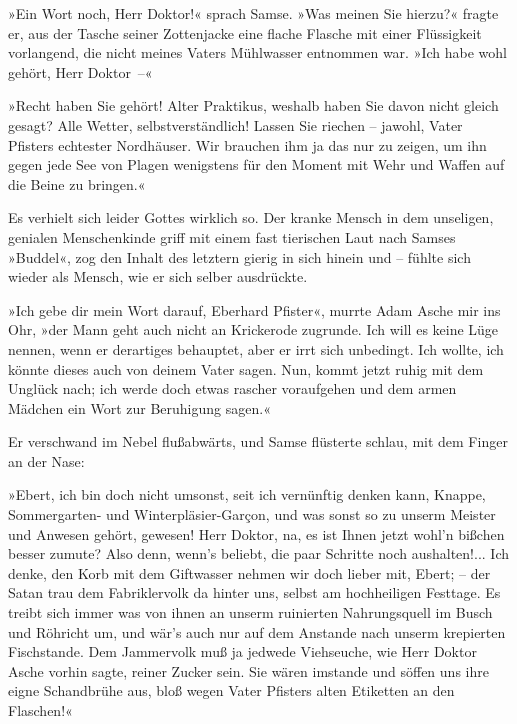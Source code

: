»Ein Wort noch, Herr Doktor!« sprach Samse. »Was meinen Sie
hierzu?« fragte er, aus der Tasche seiner Zottenjacke eine flache
Flasche mit einer Flüssigkeit vorlangend, die nicht meines Vaters
Mühlwasser entnommen war. »Ich habe wohl gehört, Herr Doktor~–«

»Recht haben Sie gehört! Alter Praktikus, weshalb haben Sie davon
nicht gleich gesagt? Alle Wetter, selbstverständlich! Lassen Sie
riechen – jawohl, Vater Pfisters echtester Nordhäuser. Wir brauchen
ihm ja das nur zu zeigen, um ihn gegen jede See von Plagen
wenigstens für den Moment mit Wehr und Waffen auf die Beine zu
bringen.«

Es verhielt sich leider Gottes wirklich so. Der kranke Mensch in
dem unseligen, genialen Menschenkinde griff mit einem fast
tierischen Laut nach Samses »Buddel«, zog den Inhalt des letztern
gierig in sich hinein und – fühlte sich wieder als Mensch, wie er
sich selber ausdrückte.

»Ich gebe dir mein Wort darauf, Eberhard Pfister«, murrte Adam
Asche mir ins Ohr, »der Mann geht auch nicht an Krickerode
zugrunde. Ich will es keine Lüge nennen, wenn er derartiges
behauptet, aber er irrt sich unbedingt. Ich wollte, ich könnte
dieses auch von deinem Vater sagen. Nun, kommt jetzt ruhig mit dem
Unglück nach; ich werde doch etwas rascher voraufgehen und dem
armen Mädchen ein Wort zur Beruhigung sagen.«

Er verschwand im Nebel flußabwärts, und Samse flüsterte schlau, mit
dem Finger an der Nase:

»Ebert, ich bin doch nicht umsonst, seit ich vernünftig denken
kann, Knappe, Sommergarten- und Winterpläsier-Garçon, und was sonst
so zu unserm Meister und Anwesen gehört, gewesen! Herr Doktor, na,
es ist Ihnen jetzt wohl'n bißchen besser zumute? Also denn, wenn's
beliebt, die paar Schritte noch aushalten!... Ich denke, den Korb
mit dem Giftwasser nehmen wir doch lieber mit, Ebert; – der Satan
trau dem Fabriklervolk da hinter uns, selbst am hochheiligen
Festtage. Es treibt sich immer was von ihnen an unserm ruinierten
Nahrungsquell im Busch und Röhricht um, und wär's auch nur auf dem
Anstande nach unserm krepierten Fischstande. Dem Jammervolk muß ja
jedwede Viehseuche, wie Herr Doktor Asche vorhin sagte, reiner
Zucker sein. Sie wären imstande und söffen uns ihre eigne
Schandbrühe aus, bloß wegen Vater Pfisters alten Etiketten an den
Flaschen!«

